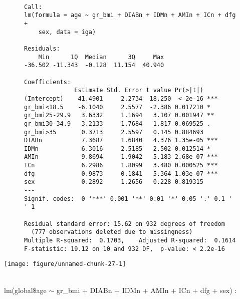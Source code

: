 \documentclass[11pt,a4paper]{article}\usepackage[]{graphicx}\usepackage[]{color}
\makeatletter
\def\maxwidth{ %
  \ifdim\Gin@nat@width>\linewidth
    \linewidth
  \else
    \Gin@nat@width
  \fi
}
\newenvironment{kframe}{%
 \def\at@end@of@kframe{}%
 \ifinner\ifhmode%
  \def\at@end@of@kframe{\end{minipage}}%
  \begin{minipage}{\columnwidth}%
 \fi\fi%
 \def\FrameCommand##1{\hskip\@totalleftmargin \hskip-\fboxsep
 \colorbox{shadecolor}{##1}\hskip-\fboxsep
     \hskip-\linewidth \hskip-\@totalleftmargin \hskip\columnwidth}%
 \MakeFramed {\advance\hsize-\width
   \@totalleftmargin\z@ \linewidth\hsize
   \@setminipage}}%
 {\par\unskip\endMakeFramed%
 \at@end@of@kframe}
\newenvironment{knitrout}{}{} %
\makeatother
\begin{document}
\begin{figure}[H]
\begin{knitrout}
\color{fgcolor}\begin{kframe}
\begin{verbatim}

Call:
lm(formula = age ~ gr_bmi + DIABn + IDMn + AMIn + ICn + dfg + 
    sex, data = iga)

Residuals:
    Min      1Q  Median      3Q     Max 
-36.502 -11.343  -0.128  11.154  40.940 

Coefficients:
              Estimate Std. Error t value Pr(>|t|)    
(Intercept)    41.4901     2.2734  18.250  < 2e-16 ***
gr_bmi<18.5    -6.1040     2.5577  -2.386 0.017210 *  
gr_bmi25-29.9   3.6332     1.1694   3.107 0.001947 ** 
gr_bmi30-34.9   3.2133     1.7684   1.817 0.069525 .  
gr_bmi>35       0.3713     2.5597   0.145 0.884693    
DIABn           7.3687     1.6840   4.376 1.35e-05 ***
IDMn            6.3016     2.5185   2.502 0.012514 *  
AMIn            9.8694     1.9042   5.183 2.68e-07 ***
ICn             6.2986     1.8099   3.480 0.000525 ***
dfg             0.9873     0.1841   5.364 1.03e-07 ***
sex             0.2892     1.2656   0.228 0.819315    
---
Signif. codes:  0 '***' 0.001 '**' 0.01 '*' 0.05 '.' 0.1 ' ' 1

Residual standard error: 15.62 on 932 degrees of freedom
  (777 observations deleted due to missingness)
Multiple R-squared:  0.1703,	Adjusted R-squared:  0.1614 
F-statistic: 19.12 on 10 and 932 DF,  p-value: < 2.2e-16
\end{verbatim}
\end{kframe}
\end{knitrout}
\end{figure}



\begin{knitrout}
\color{fgcolor}
\texttt{[image: figure/unnamed-chunk-27-1]} 

\end{knitrout}
~\\

lm(global$\mathdollar$age $\sim$ gr\_bmi + DIABn + IDMn + AMIn + ICn + dfg + sex) :
\end{document}
